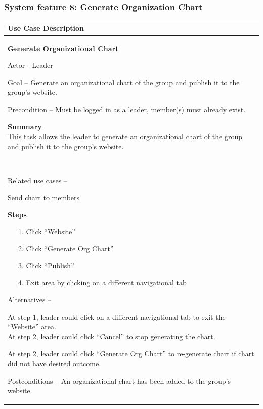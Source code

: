 \documentclass[letterpaper]{article}
\newcommand\textstyleDefaultParagraphFont[1]{#1}
\begin{document}
\bigskip

\subsubsection[System feature 8: Generate Organization Chart]{\rmfamily
System feature 8: Generate Organization Chart}
\begin{flushleft}
\tablehead{}
\begin{supertabular}{|m{6.42126in}|}
\hline
\bfseries\color{black} Use Case Description\\\hline
{\bfseries\color{black} Generate Organizational Chart}

{\color{black} Actor - Leader}

{\color{black} Goal -- Generate an organizational chart of the group and
publish it to the group{\textquoteright}s website.}

{\color{black} Precondition -- Must be logged in as a leader, member(s)
must already exist.}

{\color{black} \textstyleDefaultParagraphFont{\textbf{Summary}}\newline
\textstyleDefaultParagraphFont{This }\textstyleDefaultParagraphFont{task
allows the leader to generate an organizational chart of the group and
publish it to the
group}\textstyleDefaultParagraphFont{{\textquoteright}}\textstyleDefaultParagraphFont{s
website.}}

~

{\color{black} Related use cases -- }

{\color{black} Send chart to members}

{\bfseries\color{black} Steps}

{\color{black} \ \ \ 1. Click
{\textquotedblleft}Website{\textquotedblright} }

{\color{black} \ \ \ 2. Click {\textquotedblleft}Generate Org
Chart{\textquotedblright} }

{\color{black} \ \ \ 3. Click
{\textquotedblleft}Publish{\textquotedblright}}

{\color{black} \ \ \ 4. Exit area by clicking on a different
navigational tab}

{\color{black} Alternatives -- }

{\color{black} At step 1, leader could click on a different navigational
tab to exit the {\textquotedblleft}Website{\textquotedblright}
area.\newline
At step 2, leader could click
{\textquotedblleft}Cancel{\textquotedblright} to stop generating the
chart.}

{\color{black} At step 2, leader could click {\textquotedblleft}Generate
Org Chart{\textquotedblright} to re-generate chart if chart did not
have desired outcome.}

\color{black} Postconditions -- An organizational chart has been added
to the group{\textquoteright}s website.\\\hline
\end{supertabular}
\end{flushleft}
\end{document}
